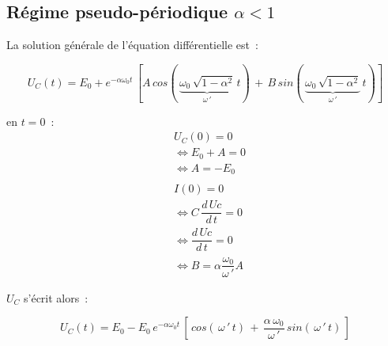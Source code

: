 \subsection*{Régime pseudo-périodique $\alpha < 1$}

La solution générale de l'équation différentielle est~:

$$U_C(t) = E_0 + e^{-\alpha\omega_0t}\,\left[A\,cos(\,\underbrace{\omega_0\,\sqrt{1-\alpha^2}}_{\omega\,'}\,t)\,+\,B\,sin(\,\underbrace{\omega_0\,\sqrt{1-\alpha^2}}_{\omega\,'}\,t)\right]$$

en $t=0$~:
\begin{align*}
	& U_C(0) = 0 \\
	& \Leftrightarrow E_0 + A = 0 \\
	& \Leftrightarrow A = -E_0 \\
	& \\
	& I(0) = 0 \\
	& \Leftrightarrow C\,\dfrac{d\,Uc}{d\,t} = 0 \\
	& \Leftrightarrow \dfrac{d\,Uc}{d\,t} = 0 \\
	& \Leftrightarrow B = \alpha \dfrac{\omega_0}{\omega\,'} A 
\end{align*}

\pagebreak

$U_C$ s'écrit alors~:

$$U_C(t) = E_0 -E_0\,e^{-\alpha\omega_0t}\,\left[\,cos(\,\omega\,'\,t)\,+\,\dfrac{\alpha\,\omega_0}{\omega\,'}\,sin(\,\omega\,'\,t)\,\right]$$ \\

